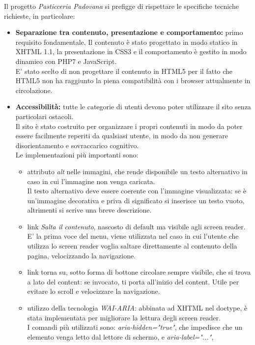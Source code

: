 Il progetto \emph{Pasticceria Padovana} si prefigge di rispettare le specifiche tecniche richieste, in particolare:
\begin{itemize}
	\item \textbf{Separazione tra contenuto, presentazione e comportamento:} primo requisito fondamentale. 
	Il contenuto è stato progettato in modo statico in XHTML 1.1, la presentazione in CSS3 e il comportamento è gestito in modo dinamico con PHP7 e JavaScript.\\
	E' stato scelto di non progettare il contenuto in HTML5 per il fatto che HTML5 non ha raggiunto la piena compatibilità con i browser attualmente in circolazione.\\
	\item \textbf{Accessibilità:} tutte le categorie di utenti devono poter utilizzare il sito senza particolari ostacoli.\\ 
	Il sito è stato costruito per organizzare i propri contenuti in modo da poter essere facilmente reperiti da qualsiasi utente, 
	in modo da non generare disorientamento e sovraccarico cognitivo.\\ 
	Le implementazioni più importanti sono:
	\begin{itemize}
		\item attributo \emph{alt} nelle immagini, che rende disponibile un testo alternativo in caso in cui l'immagine non venga caricata.\\ 
		Il testo alternativo deve essere coerente con l'immagine visualizzata: se è un'immagine decorativa e priva di significato si inserisce un testo vuoto, 
		altrimenti si scrive una breve descrizione.
		\item link \emph{Salta il contenuto}, nascosto di default ma visibile agli screen reader. E' la prima voce del menu, viene utilizzata nel caso in cui l'utente che
		utilizza lo screen reader voglia saltare direttamente al contenuto della pagina, velocizzando la navigazione.
		\item link {torna su}, sotto forma di bottone circolare sempre visibile, che si trova a lato del content: se invocato, ti porta all'inizio del content. 
		Utile per evitare lo scroll e velocizzare la navigazione.
		\item utilizzo della tecnologia \emph{WAI-ARIA}: abbinata ad XHTML nel doctype, è stata implementata per migliorare la lettura degli screen reader.\\
		I comandi più utilizzati sono: \emph{aria-hidden="true"}, che impedisce che un elemento venga letto dal lettore di schermo, e \emph{aria-label="..."}, 

\end{itemize}
\end{itemize}
